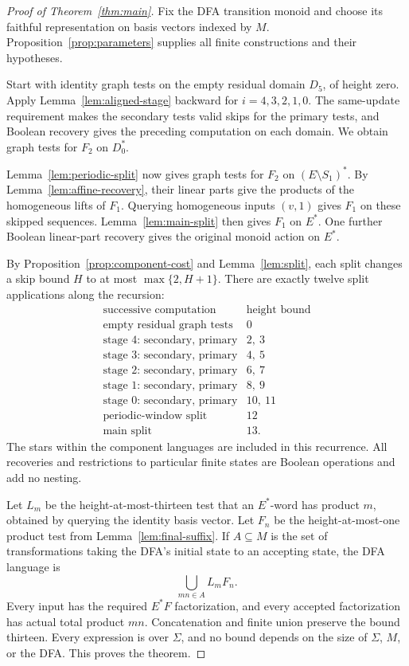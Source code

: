 \begin{proof}[Proof of Theorem~\ref{thm:main}]
Fix the DFA transition monoid and choose its faithful representation on
basis vectors indexed by \(M\). Proposition~\ref{prop:parameters} supplies
all finite constructions and their hypotheses.

Start with identity graph tests on the empty residual domain \(D_5\), of
height zero. Apply Lemma~\ref{lem:aligned-stage} backward for
\(i=4,3,2,1,0\). The same-update requirement makes the secondary tests valid
skips for the primary tests, and Boolean recovery gives the preceding
computation on each domain. We obtain graph tests for \(F_2\) on \(D_0^*\).

Lemma~\ref{lem:periodic-split} now gives graph tests for \(F_2\) on
\((E\setminus S_1)^*\). By Lemma~\ref{lem:affine-recovery}, their linear
parts give the products of the homogeneous lifts of \(F_1\).
Querying homogeneous inputs \((v,1)\) gives \(F_1\) on these skipped sequences.
Lemma~\ref{lem:main-split} then gives \(F_1\) on \(E^*\).
One further Boolean linear-part recovery gives the original monoid action
on \(E^*\).

By Proposition~\ref{prop:component-cost} and Lemma~\ref{lem:split}, each split
changes a skip bound \(H\) to at most \(\max\{2,H+1\}\). There are exactly
twelve split applications along the recursion:
\[
\begin{array}{c|c}
 \text{successive computation} & \text{height bound}\\ \hline
 \text{empty residual graph tests} &0\\
 \text{stage 4: secondary, primary}&2,\ 3\\
 \text{stage 3: secondary, primary}&4,\ 5\\
 \text{stage 2: secondary, primary}&6,\ 7\\
 \text{stage 1: secondary, primary}&8,\ 9\\
 \text{stage 0: secondary, primary}&10,\ 11\\
 \text{periodic-window split}&12\\
 \text{main split}&13 .
\end{array}
\]
The stars within the component languages are included in this recurrence.
All recoveries and restrictions to particular finite states are Boolean
operations and add no nesting.

Let \(L_m\) be the height-at-most-thirteen test that an \(E^*\)-word has
product \(m\), obtained by querying the identity basis vector.
Let \(F_n\) be the height-at-most-one product test from
Lemma~\ref{lem:final-suffix}. If \(A\subseteq M\) is the set of transformations
taking the DFA's initial state to an accepting state, the DFA language is
\[
                         \bigcup_{mn\in A} L_m F_n .
\]
Every input has the required \(E^*F\) factorization, and every accepted
factorization has actual total product \(mn\).
Concatenation and finite union preserve the bound thirteen.
Every expression is over \(\Sigma\), and no bound depends on the size of
\(\Sigma\), \(M\), or the DFA. This proves the theorem.
\end{proof}


